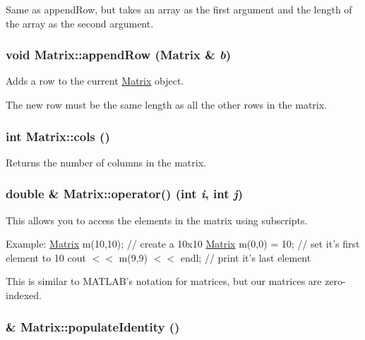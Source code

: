 Same as appendRow, but takes an array as the first argument and the length of the array as the second argument. 

\hypertarget{class_matrix_20c175983a6b23a83fccfe8f726b3b07}{
\subsubsection[{appendRow}]{\setlength{\rightskip}{0pt plus 5cm}void Matrix::appendRow ({\bf Matrix} \& {\em b})}}
\label{class_matrix_20c175983a6b23a83fccfe8f726b3b07}


Adds a row to the current \hyperlink{class_matrix}{Matrix} object. 

The new row must be the same length as all the other rows in the matrix. \hypertarget{class_matrix_35649f43610688d020b2cad91f616d51}{
\subsubsection[{cols}]{\setlength{\rightskip}{0pt plus 5cm}int Matrix::cols ()}}
\label{class_matrix_35649f43610688d020b2cad91f616d51}


Returns the number of columns in the matrix. 

\hypertarget{class_matrix_83a1c6c6f2f7c88a72a7ee98cae90c24}{
\subsubsection[{operator()}]{\setlength{\rightskip}{0pt plus 5cm}double \& Matrix::operator() (int {\em i}, \/  int {\em j})}}
\label{class_matrix_83a1c6c6f2f7c88a72a7ee98cae90c24}


This allows you to access the elements in the matrix using subscripts. 

Example: \hyperlink{class_matrix}{Matrix} m(10,10); // create a 10x10 \hyperlink{class_matrix}{Matrix} m(0,0) = 10; // set it's first element to 10 cout $<$$<$ m(9,9) $<$$<$ endl; // print it's last element

This is similar to MATLAB's notation for matrices, but our matrices are zero-indexed. \hypertarget{class_matrix_0ee71091770a4e83e54860f291ef1b7d}{
\subsubsection[{populateIdentity}]{ \& Matrix::populateIdentity ()}}
\label{class_matrix_0ee71091770a4e83e54860f291ef1b7d}


